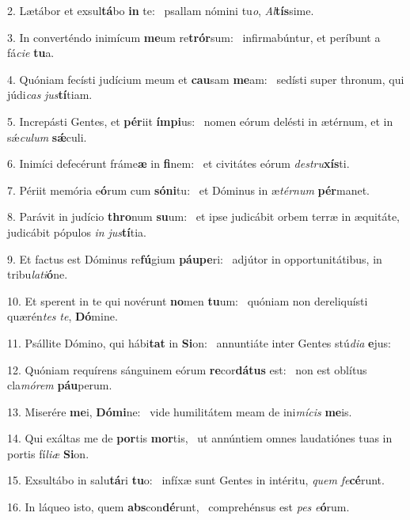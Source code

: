 2. Lætábor et exsul\textbf{tá}bo \textbf{in} te: \ast\  psallam nómini tu\textit{o}, \textit{Al}\textbf{tís}sime.\

3. In converténdo inimícum \textbf{me}um re\textbf{trór}sum: \ast\  infirmabúntur, et períbunt a fá\textit{ci}\textit{e} \textbf{tu}a.\

4. Quóniam fecísti judícium meum et \textbf{cau}sam \textbf{me}am: \ast\  sedísti super thronum, qui júdi\textit{cas} \textit{jus}\textbf{tí}tiam.\

5. Increpásti Gentes, et \textbf{pér}iit \textbf{ím}\textbf{pi}us: \ast\  nomen eórum delésti in ætérnum, et in sǽ\textit{cu}\textit{lum} \textbf{sǽ}culi.\

6. Inimíci defecérunt fráme\textbf{æ} in \textbf{fi}nem: \ast\  et civitátes eórum \textit{de}\textit{stru}\textbf{xís}ti.\

7. Périit memória e\textbf{ó}rum cum \textbf{só}\textbf{ni}tu: \ast\  et Dóminus in æ\textit{tér}\textit{num} \textbf{pér}manet.\

8. Parávit in judício \textbf{thro}num \textbf{su}um: \ast\  et ipse judicábit orbem terræ in æquitáte, judicábit pópulos \textit{in} \textit{jus}\textbf{tí}tia.\

9. Et factus est Dóminus re\textbf{fú}gium \textbf{páu}\textbf{pe}ri: \ast\  adjútor in opportunitátibus, in tribu\textit{la}\textit{ti}\textbf{ó}ne.\

10. Et sperent in te qui novérunt \textbf{no}men \textbf{tu}um: \ast\  quóniam non dereliquísti quærén\textit{tes} \textit{te}, \textbf{Dó}mine.\

11. Psállite Dómino, qui hábi\textbf{tat} in \textbf{Si}on: \ast\  annuntiáte inter Gentes stú\textit{di}\textit{a} \textbf{e}jus:\

12. Quóniam requírens sánguinem eórum \textbf{re}cor\textbf{dá}\textbf{tus} est: \ast\  non est oblítus cla\textit{mó}\textit{rem} \textbf{páu}perum.\

13. Miserére \textbf{me}i, \textbf{Dó}\textbf{mi}ne: \ast\  vide humilitátem meam de ini\textit{mí}\textit{cis} \textbf{me}is.\

14. Qui exáltas me de \textbf{por}tis \textbf{mor}tis, \ast\  ut annúntiem omnes laudatiónes tuas in portis fí\textit{li}\textit{æ} \textbf{Si}on.\

15. Exsultábo in salu\textbf{tá}ri \textbf{tu}o: \ast\  infíxæ sunt Gentes in intéritu, \textit{quem} \textit{fe}\textbf{cé}runt.\

16. In láqueo isto, quem \textbf{abs}con\textbf{dé}runt, \ast\  comprehénsus est \textit{pes} \textit{e}\textbf{ó}rum.\

